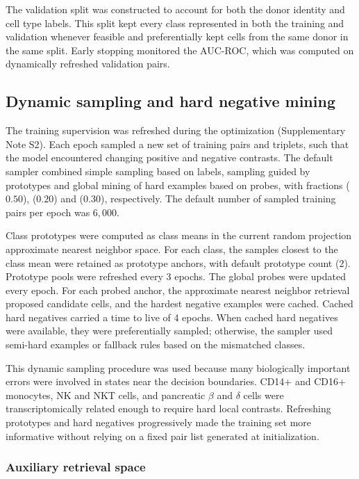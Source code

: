 \documentclass[11pt]{article}
\begin{document}
The validation split was constructed to account for both the donor identity and cell type labels. This split kept every class represented in both the training and validation whenever feasible and preferentially kept cells from the same donor in the same split. Early stopping monitored the AUC-ROC, which was computed on dynamically refreshed validation pairs.

\subsection*{Dynamic sampling and hard negative mining}

The training supervision was refreshed during the optimization (Supplementary Note S2). Each epoch sampled a new set of training pairs and triplets, such that the model encountered changing positive and negative contrasts. The default sampler combined simple sampling based on labels, sampling guided by prototypes and global mining of hard examples based on probes, with fractions ($0.50$), ($0.20$) and ($0.30$), respectively. The default number of sampled training pairs per epoch was $6,000$.

Class prototypes were computed as class means in the current random projection approximate nearest neighbor space. For each class, the samples closest to the class mean were retained as prototype anchors, with default prototype count (2). Prototype pools were refreshed every 3 epochs. The global probes were updated every epoch. For each probed anchor, the approximate nearest neighbor retrieval proposed candidate cells, and the hardest negative examples were cached. Cached hard negatives carried a time to live of 4 epochs. When cached hard negatives were available, they were preferentially sampled; otherwise, the sampler used semi-hard examples or fallback rules based on the mismatched classes.

This dynamic sampling procedure was used because many biologically important errors were involved in states near the decision boundaries. CD14+ and CD16+ monocytes, NK and NKT cells, and pancreatic $\beta$ and $\delta$ cells were transcriptomically related enough to require hard local contrasts. Refreshing prototypes and hard negatives progressively made the training set more informative without relying on a fixed pair list generated at initialization.

\subsubsection*{Auxiliary retrieval space}
\end{document}
